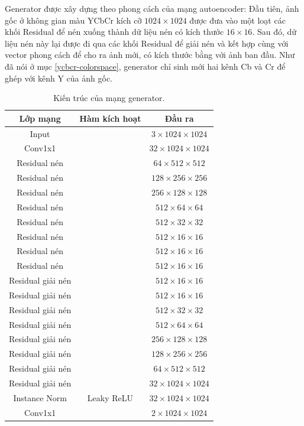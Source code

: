 \documentclass[12pt]{extreport}
\begin{document}
Generator được xây dựng theo phong cách của mạng autoencoder: Đầu tiên, ảnh gốc ở không gian màu YCbCr kích cỡ $ 1024 \times 1024 $ được đưa vào một loạt các khối Residual để nén xuống thành dữ liệu nén có kích thước $ 16 \times 16 $. Sau đó, dữ liệu nén này lại được đi qua các khối Residual để giải nén và kết hợp cùng với vector phong cách để cho ra ảnh mới, có kích thước bằng với ảnh ban đầu. Như đã nói ở mục \ref{ycbcr-colorspace}, generator chỉ sinh mới hai kênh Cb và Cr để ghép với kênh Y của ảnh gốc.

\begin{table}[H]
    \centering
    \begin{tabular}{c c c}
        Lớp mạng          & Hàm kích hoạt & Đầu ra                         \\
        \hline
        Input             &               & $ 3 \times 1024 \times 1024 $  \\
        \hline
        Conv1x1           &               & $ 32 \times 1024 \times 1024 $ \\
        Residual nén      &               & $ 64 \times 512 \times 512 $   \\
        Residual nén      &               & $ 128 \times 256 \times 256 $  \\
        Residual nén      &               & $ 256 \times 128 \times 128 $  \\
        Residual nén      &               & $ 512 \times 64 \times 64 $    \\
        Residual nén      &               & $ 512 \times 32 \times 32 $    \\
        Residual nén      &               & $ 512 \times 16 \times 16 $    \\
        Residual nén      &               & $ 512 \times 16 \times 16 $    \\
        Residual nén      &               & $ 512 \times 16 \times 16 $    \\
        Residual giải nén &               & $ 512 \times 16 \times 16 $    \\
        Residual giải nén &               & $ 512 \times 16 \times 16 $    \\
        Residual giải nén &               & $ 512 \times 32 \times 32 $    \\
        Residual giải nén &               & $ 512 \times 64 \times 64 $    \\
        Residual giải nén &               & $ 256 \times 128 \times 128 $  \\
        Residual giải nén &               & $ 128 \times 256 \times 256 $  \\
        Residual giải nén &               & $ 64 \times 512 \times 512 $   \\
        Residual giải nén &               & $ 32 \times 1024 \times 1024 $ \\
        Instance Norm     & Leaky ReLU    & $ 32 \times 1024 \times 1024 $ \\
        Conv1x1           &               & $ 2 \times 1024 \times 1024 $  \\
    \end{tabular}
    \caption{Kiến trúc của mạng generator.}
\end{table}
\end{document}
